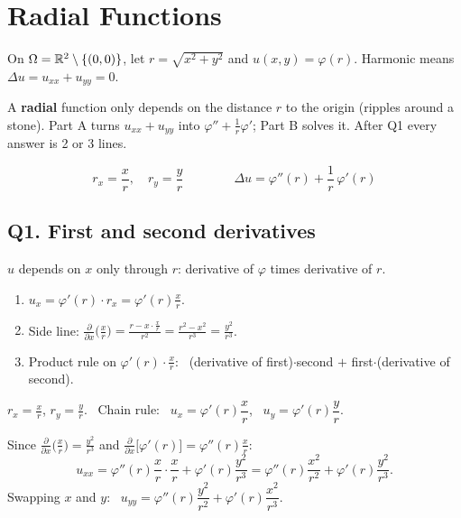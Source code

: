 \renewcommand{\chapribbontext}{Problem 3 \;·\; 5 pts}
\chapter[Problem 3: Radial Functions]{Radial Functions}\label{ch:p3}

\begin{examnote}[title={The mock}]
On $\Omega=\mathbb{R}^2\setminus\{(0,0)\}$, let $r=\sqrt{x^2+y^2}$ and $u(x,y)=\varphi(r)$. Harmonic means
$\Delta u=u_{xx}+u_{yy}=0$.
\end{examnote}

\begin{idea}
A \textbf{radial} function only depends on the distance $r$ to the origin (ripples around a stone).
Part A turns $u_{xx}+u_{yy}$ into $\varphi''+\frac1r\varphi'$; Part B solves it. After Q1 every answer is 2 or 3 lines.
\end{idea}

\begin{remember}[title={The only two things to memorise}]
\[
  r_x=\frac xr,\quad r_y=\frac yr \qquad\qquad \Delta u=\varphi''(r)+\frac1r\,\varphi'(r)
\]
\end{remember}

\section{Q1. First and second derivatives}



\begin{recipe}
$u$ depends on $x$ only through $r$: derivative of $\varphi$ times derivative of $r$.
\begin{enumerate}
  \item $u_x=\varphi'(r)\cdot r_x=\varphi'(r)\frac xr$.
  \item Side line: $\frac{\partial}{\partial x}\Big(\frac xr\Big)=\frac{r-x\cdot\frac xr}{r^2}=\frac{r^2-x^2}{r^3}=\frac{y^2}{r^3}$.
  \item Product rule on $\varphi'(r)\cdot\frac xr$: \ (derivative of first)$\cdot$second $+$ first$\cdot$(derivative of second).
\end{enumerate}
\end{recipe}

\begin{writethis}
$r_x=\frac xr$, $r_y=\frac yr$. \ Chain rule: \ $u_x=\varphi'(r)\dfrac xr$, \ $u_y=\varphi'(r)\dfrac yr$.

Since $\frac{\partial}{\partial x}\big(\frac xr\big)=\frac{y^2}{r^3}$ and $\frac{\partial}{\partial x}\big[\varphi'(r)\big]=\varphi''(r)\frac xr$:
\[
  u_{xx}=\varphi''(r)\frac xr\cdot\frac xr+\varphi'(r)\frac{y^2}{r^3}=\varphi''(r)\frac{x^2}{r^2}+\varphi'(r)\frac{y^2}{r^3}.
\]
Swapping $x$ and $y$: \ $u_{yy}=\varphi''(r)\dfrac{y^2}{r^2}+\varphi'(r)\dfrac{x^2}{r^3}$.
\end{writethis}


